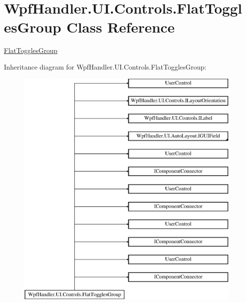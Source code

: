 \hypertarget{class_wpf_handler_1_1_u_i_1_1_controls_1_1_flat_toggles_group}{}\section{Wpf\+Handler.\+U\+I.\+Controls.\+Flat\+Toggles\+Group Class Reference}
\label{class_wpf_handler_1_1_u_i_1_1_controls_1_1_flat_toggles_group}


\mbox{\hyperlink{class_wpf_handler_1_1_u_i_1_1_controls_1_1_flat_toggles_group}{Flat\+Toggles\+Group}}  


Inheritance diagram for Wpf\+Handler.\+U\+I.\+Controls.\+Flat\+Toggles\+Group\+:\begin{figure}[H]
\begin{center}
\leavevmode
\includegraphics[height=12.000000cm]{dd/dae/class_wpf_handler_1_1_u_i_1_1_controls_1_1_flat_toggles_group}
\end{center}
\end{figure}
